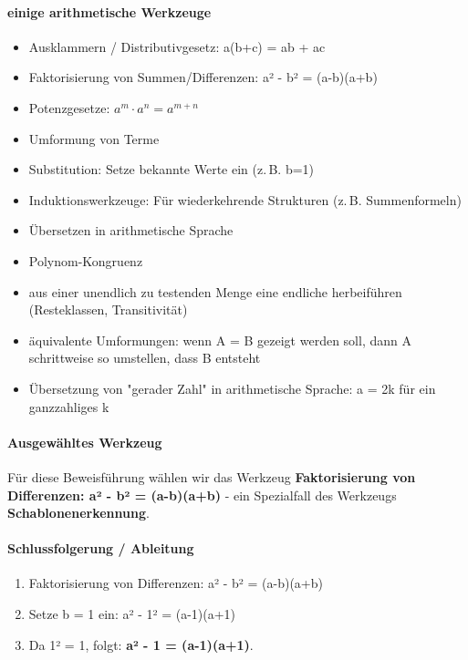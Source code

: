 \documentclass{article}
\begin{document}
      \paragraph{einige arithmetische Werkzeuge}
      \begin{itemize}
        \item Ausklammern / Distributivgesetz: a(b+c) = ab + ac

        \item Faktorisierung von Summen/Differenzen: a² - b² = (a-b)(a+b)

        \item Potenzgesetze: $a^m \cdot a^n = a^{m+n}$

        \item Umformung von Terme

        \item Substitution: Setze bekannte Werte ein (z.\,B. b=1)

        \item Induktionswerkzeuge: Für wiederkehrende Strukturen (z.\,B. Summenformeln)

        \item Übersetzen in arithmetische Sprache

        \item Polynom-Kongruenz

        \item aus einer unendlich zu testenden Menge eine endliche herbeiführen (Resteklassen, Transitivität)

        \item äquivalente Umformungen: wenn A = B gezeigt werden soll, dann A schrittweise so umstellen, dass B entsteht

        \item Übersetzung von "gerader Zahl" in arithmetische Sprache: a = 2k für ein ganzzahliges k

      \end{itemize}

      \paragraph{Ausgewähltes Werkzeug}
      
Für diese Beweisführung wählen wir das Werkzeug \textbf{Faktorisierung von Differenzen: a² - b² = (a-b)(a+b)} - ein Spezialfall des Werkzeugs \textbf{Schablonenerkennung}.


      \paragraph{Schlussfolgerung / Ableitung}
      \begin{enumerate}
        \item Faktorisierung von Differenzen: a² - b² = (a-b)(a+b)

        \item Setze b = 1 ein: a² - 1² = (a-1)(a+1)

        \item Da 1² = 1, folgt: \textbf{a² - 1 = (a-1)(a+1)}.

      \end{enumerate}
\end{document}

